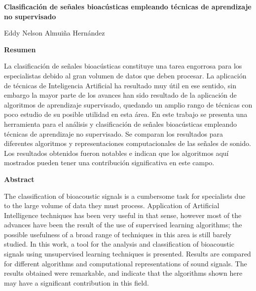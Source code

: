 \thispagestyle{empty}

\begin{center}
    \Large
    \textbf{Clasificación de señales bioacústicas empleando técnicas de aprendizaje no supervisado}

    \vspace{0.4cm}
    \large
    Eddy Nelson Almuiña Hernández

    \vspace{0.9cm}
    \textbf{Resumen}
\end{center}

La clasificación de señales bioacústicas constituye una tarea engorrosa para los especialistas debido al gran volumen de datos que deben procesar.
La aplicación de técnicas de Inteligencia Artificial ha resultado muy útil en ese sentido, sin embargo la mayor parte de los avances han sido resultado de la aplicación de algoritmos de aprendizaje supervisado, quedando un amplio rango de técnicas con poco estudio de su posible utilidad en esta área.
En este trabajo se presenta una herramienta para el análisis y clasificación de señales bioacústicas empleando técnicas de aprendizaje no supervisado.
Se comparan los resultados para diferentes algoritmos y representaciones computacionales de las señales de sonido.
Los resultados obtenidos fueron notables e indican que los algoritmos aquí mostrados pueden tener una contribución significativa en este campo.

\begin{center}
    \vspace{0.9cm}
    \textbf{Abstract}
\end{center}

The classification of bioacoustic signals is a cumbersome task for specialists due to the large volume of data they must process.
Application of Artificial Intelligence techniques has been very useful in that sense, however most of the advances have been the result of the use of supervised learning algorithms;
the possible usefulness of a broad range of techniques in this area is still barely studied.
In this work, a tool for the analysis and classification of bioacoustic signals using unsupervised learning techniques is presented.
Results are compared for different algorithms and computational representations of sound signals.
The results obtained were remarkable, and indicate that the algorithms shown here may have a significant contribution in this field.

\newpage